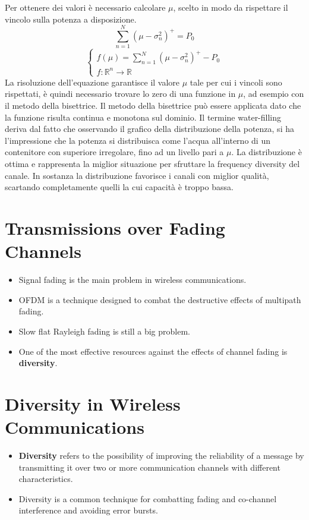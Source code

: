 Per ottenere dei valori è necessario calcolare $\mu$, scelto in modo da rispettare il vincolo sulla potenza a disposizione.
\[
    \sum_{n=1}^{N} (\mu - \sigma_n^2)^+ = P_0
\]
\[
    \begin{cases}
        f(\mu) = \sum_{n=1}^{N} (\mu - \sigma_n^2)^+ - P_0 \\
        f: \mathbb{R}^n \rightarrow \mathbb{R}
    \end{cases}
\]
La risoluzione dell'equazione garantisce il valore $\mu$ tale per cui i vincoli sono rispettati, è quindi necessario trovare lo zero di una funzione in $\mu$, ad esempio con il metodo della bisettrice. Il metodo della bisettrice può essere applicata dato che la funzione risulta continua e monotona sul dominio.
Il termine water-filling deriva dal fatto che osservando il grafico della distribuzione della potenza, si ha l'impressione che la potenza si distribuisca come l'acqua all'interno di un contenitore con superiore irregolare, fino ad un livello pari a $\mu$.
La distribuzione è ottima e rappresenta la miglior situazione per sfruttare la frequency diversity del canale. In sostanza la distribuzione favorisce i canali con miglior qualità, scartando completamente quelli la cui capacità è troppo bassa.






\section*{Transmissions over Fading Channels}

\begin{itemize}
    \item Signal fading is the main problem in wireless communications.
    \item OFDM is a technique designed to combat the destructive effects of multipath fading.
    \item Slow flat Rayleigh fading is still a big problem.
    \item One of the most effective resources against the effects of channel fading is \textbf{diversity}.
\end{itemize}

\section*{Diversity in Wireless Communications}

\begin{itemize}
    \item \textbf{Diversity} refers to the possibility of improving the reliability of a message by transmitting it over two or more communication channels with different characteristics.
    \item Diversity is a common technique for combatting fading and co-channel interference and avoiding error bursts.
\end{itemize}


